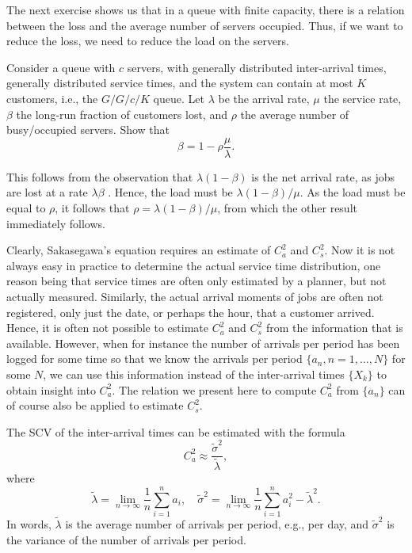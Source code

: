 The next exercise shows us that in a queue with finite capacity, there is a relation between the loss and the average number of servers occupied.
Thus, if we want to reduce the loss, we need to reduce the load on the servers.
\begin{exercise}
 Consider a queue with $c$ servers, with generally distributed inter-arrival times, generally distributed service times, and the system can contain at most $K$ customers, i.e., the $G/G/c/K$ queue.
 Let $\lambda$ be the arrival rate, $\mu$ the service rate, $\beta$ the long-run fraction of customers lost, and $\rho$ the average number of busy/occupied servers.
 Show that
 \begin{equation*}
 \beta = 1 - \rho\frac{\mu}{\lambda}.
 \end{equation*}
\begin{solution}
 This follows from the observation that $\lambda(1-\beta)$ is the net
 arrival rate, as jobs are lost at a rate $\lambda\beta$ . Hence, the
 load must be $\lambda(1-\beta)/\mu$. As the load must be equal to
 $\rho$, it follows that $\rho = \lambda(1-\beta)/\mu$, from which the
 other result immediately follows.
\end{solution}
\end{exercise}



Clearly, Sakasegawa's equation requires an estimate of $C_a^2$ and $C_s^2$.
Now it is not always easy in practice to determine the actual service time distribution, one reason being that service times are often only estimated by a planner, but not actually measured.
Similarly, the actual arrival moments of jobs are often not registered, only just the date, or perhaps the hour, that a customer arrived.
Hence, it is often not possible to estimate $C_a^2$ and $C_s^2$ from the information that is available.
However, when for instance the number of arrivals per period has been logged for some time so that we know the arrivals per period $\{a_n, n=1,\ldots, N\}$ for some $N$, we can use this information instead of the inter-arrival times $\{X_k\}$ to obtain insight into $C_a^2$.
The relation we present here to compute $C_a^2$ from $\{a_n\}$ can of course also be applied to estimate $C_s^2$.

\begin{theorem} The SCV of the inter-arrival times can be estimated
 with the formula
\begin{equation*}
C_a^2 \approx \frac{\tilde \sigma^2}{\tilde \lambda},
\end{equation*}
where 
\begin{equation*}
\tilde \lambda = \lim_{n\to\infty} \frac 1n \sum_{i=1}^n a_i,\quad 
\tilde \sigma^2 = \lim_{n\to\infty} \frac 1 n \sum_{i=1}^n a_i^2 - \tilde \lambda^2.
\end{equation*}
In words, $\tilde \lambda$ is the average number of arrivals per period, e.g., per day, and $\tilde \sigma^2 $ is the variance of the number of arrivals per period.
\end{theorem}

